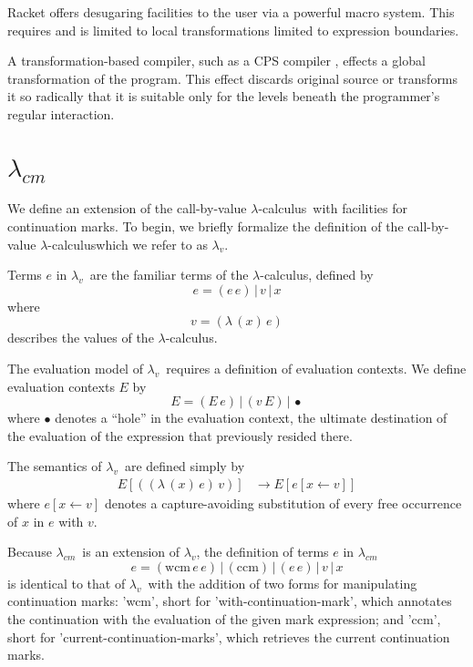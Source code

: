 \documentclass{llncs}
\newcommand{\cm}[0]{$\lambda_{cm}$}
\newcommand{\lv}[0]{$\lambda_v$}
\newcommand{\lc}[0]{$\lambda$-calculus}
\newcommand{\wcm}[2]{(\mathrm{wcm}\,#1\,#2)}
\newcommand{\ccm}[0]{(\mathrm{ccm})}
\newcommand{\app}[2]{(#1\,#2)}
\newcommand{\abs}[2]{(\lambda\,(#1)\,#2)}
\newcommand{\hole}[0]{\bullet}
\newcommand{\rr}[0]{\rightarrow}
\begin{document}
Racket offers desugaring facilities to the user via a powerful macro system. This requires and is limited to local transformations limited to expression boundaries.

A transformation-based compiler, such as a CPS compiler \cite{appel2007compiling}, effects a global transformation of the program. This effect discards original source or transforms it so radically that it is suitable only for the levels beneath the programmer's regular interaction.

\section{\cm}

We define an extension of the call-by-value \lc\ with facilities for continuation marks. To begin, we briefly formalize the definition of the call-by-value \lc which we refer to as \lv.

Terms $e$ in \lv\ are the familiar terms of the \lc, defined by
\begin{equation}
e=\app{e}{e}\,|\,v\,|\,x
\end{equation}
where 
\begin{equation}
v=\abs{x}{e}
\end{equation}
describes the values of the \lc.

The evaluation model of \lv\ requires a definition of evaluation contexts. We define evaluation contexts $E$ by
\begin{equation}
E=\app{E}{e}\,|\,\app{v}{E}\,|\,\hole
\end{equation}
where $\hole$ denotes a ``hole'' in the evaluation context, the ultimate destination of the evaluation of the expression that previously resided there.

The semantics of \lv\ are defined simply by
\begin{align}
E[\app{\abs{x}{e}}{v}]  &\rr E[e[x\leftarrow v]]
\end{align}
where $e[x\leftarrow v]$ denotes a capture-avoiding substitution of every free occurrence of $x$ in $e$ with $v$.

Because \cm\ is an extension of \lv, the definition of terms $e$ in \cm\ 
\begin{equation}
e=\wcm{e}{e}\,|\,\ccm\,|\,\app{e}{e}\,|\,v\,|\,x
\end{equation}
is identical to that of \lv\ with the addition of two forms for manipulating continuation marks: \scheme'wcm', short for \scheme'with-continuation-mark', which annotates the continuation with the evaluation of the given mark expression; and \scheme'ccm', short for \scheme'current-continuation-marks', which retrieves the current continuation marks.
\end{document}
